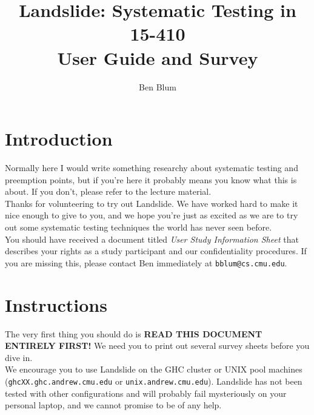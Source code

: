 \documentclass{article}
\begin{document}

\title{\bf Landslide: Systematic Testing in 15-410 \\ User Guide and Survey}
\author{Ben Blum}
\date{}
\maketitle

\section{Introduction}

Normally here I would write something researchy about systematic testing and preemption points, but if you're here it probably means you know what this is about. If you don't, please refer to the lecture material.
\\

\noindent Thanks for volunteering to try out Landslide. We have worked hard to make it nice enough to give to you, and we hope you're just as excited as we are to try out some systematic testing techniques the world has never seen before.
\\

\noindent You should have received a document titled {\em User Study Information Sheet} that describes your rights as a study participant and our confidentiality procedures. If you are missing this, please contact Ben immediately at {\tt bblum@cs.cmu.edu}.

\section{Instructions}

The very first thing you should do is {\bf READ THIS DOCUMENT ENTIRELY FIRST!} We need you to print out several survey sheets before you dive in.
\\

\noindent We encourage you to use Landslide on the GHC cluster or UNIX pool machines ({\tt ghcXX.ghc.andrew.cmu.edu} or {\tt unix.andrew.cmu.edu}). Landslide has not been tested with other configurations and will probably fail mysteriously on your personal laptop, and we cannot promise to be of any help.
\end{document}
